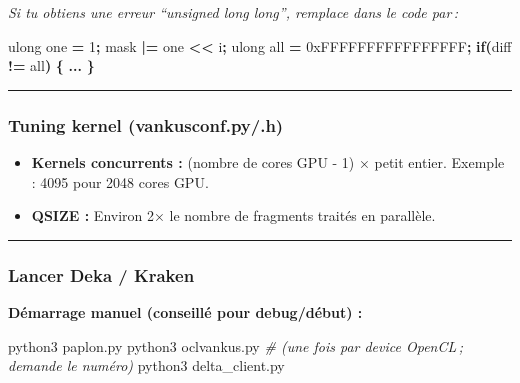 \documentclass[
  french,
]{article}
\newenvironment{Shaded}{\begin{snugshade}}{\end{snugshade}}
\newcommand{\BaseNTok}[1]{\textcolor[rgb]{0.00,0.00,0.81}{#1}}
\newcommand{\CommentTok}[1]{\textcolor[rgb]{0.56,0.35,0.01}{\textit{#1}}}
\newcommand{\ControlFlowTok}[1]{\textcolor[rgb]{0.13,0.29,0.53}{\textbf{#1}}}
\newcommand{\DecValTok}[1]{\textcolor[rgb]{0.00,0.00,0.81}{#1}}
\newcommand{\ExtensionTok}[1]{#1}
\newcommand{\NormalTok}[1]{#1}
\newcommand{\OperatorTok}[1]{\textcolor[rgb]{0.81,0.36,0.00}{\textbf{#1}}}
\providecommand{\tightlist}{%
  \setlength{\itemsep}{0pt}\setlength{\parskip}{0pt}}
\begin{document}
\emph{Si tu obtiens une erreur ``unsigned long long'', remplace dans le
code par\,:}

\begin{Shaded}
\begin{Highlighting}[]
\NormalTok{ulong one }\OperatorTok{=} \DecValTok{1}\OperatorTok{;}
\NormalTok{mask }\OperatorTok{|=}\NormalTok{ one }\OperatorTok{\textless{}\textless{}}\NormalTok{ i}\OperatorTok{;}
\NormalTok{ulong all }\OperatorTok{=} \BaseNTok{0xFFFFFFFFFFFFFFFF}\OperatorTok{;}
\ControlFlowTok{if}\OperatorTok{(}\NormalTok{diff }\OperatorTok{!=}\NormalTok{ all}\OperatorTok{)} \OperatorTok{\{} \OperatorTok{...} \OperatorTok{\}}
\end{Highlighting}
\end{Shaded}

\begin{center}\rule{0.5\linewidth}{0.5pt}\end{center}

\subsubsection{Tuning kernel
(vankusconf.py/.h)}\label{tuning-kernel-vankusconf.py.h}

\begin{itemize}
\tightlist
\item
  \textbf{Kernels concurrents :} (nombre de cores GPU - 1) × petit
  entier. Exemple : 4095 pour 2048 cores GPU.
\item
  \textbf{QSIZE :} Environ 2× le nombre de fragments traités en
  parallèle.
\end{itemize}

\begin{center}\rule{0.5\linewidth}{0.5pt}\end{center}

\subsubsection{Lancer Deka / Kraken}\label{lancer-deka-kraken}

\textbf{Démarrage manuel (conseillé pour debug/début) :}

\begin{Shaded}
\begin{Highlighting}[]
\ExtensionTok{python3}\NormalTok{ paplon.py}
\ExtensionTok{python3}\NormalTok{ oclvankus.py   }\CommentTok{\# (une fois par device OpenCL ; demande le numéro)}
\ExtensionTok{python3}\NormalTok{ delta\_client.py}
\end{Highlighting}
\end{Shaded}
\end{document}

